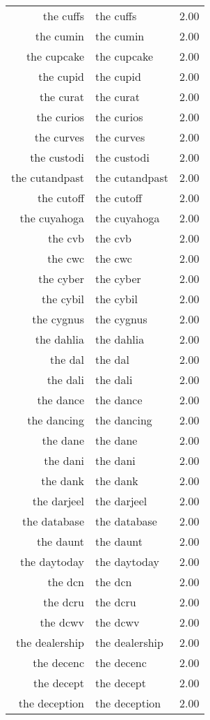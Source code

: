 \begin{table}[ht]
\begin{tabular}{rlr}
  the cuffs & the cuffs & 2.00 \\ 
  the cumin & the cumin & 2.00 \\ 
  the cupcake & the cupcake & 2.00 \\ 
  the cupid & the cupid & 2.00 \\ 
  the curat & the curat & 2.00 \\ 
  the curios & the curios & 2.00 \\ 
  the curves & the curves & 2.00 \\ 
  the custodi & the custodi & 2.00 \\ 
  the cutandpast & the cutandpast & 2.00 \\ 
  the cutoff & the cutoff & 2.00 \\ 
  the cuyahoga & the cuyahoga & 2.00 \\ 
  the cvb & the cvb & 2.00 \\ 
  the cwc & the cwc & 2.00 \\ 
  the cyber & the cyber & 2.00 \\ 
  the cybil & the cybil & 2.00 \\ 
  the cygnus & the cygnus & 2.00 \\ 
  the dahlia & the dahlia & 2.00 \\ 
  the dal & the dal & 2.00 \\ 
  the dali & the dali & 2.00 \\ 
  the dance & the dance & 2.00 \\ 
  the dancing & the dancing & 2.00 \\ 
  the dane & the dane & 2.00 \\ 
  the dani & the dani & 2.00 \\ 
  the dank & the dank & 2.00 \\ 
  the darjeel & the darjeel & 2.00 \\ 
  the database & the database & 2.00 \\ 
  the daunt & the daunt & 2.00 \\ 
  the daytoday & the daytoday & 2.00 \\ 
  the dcn & the dcn & 2.00 \\ 
  the dcru & the dcru & 2.00 \\ 
  the dcwv & the dcwv & 2.00 \\ 
  the dealership & the dealership & 2.00 \\ 
  the decenc & the decenc & 2.00 \\ 
  the decept & the decept & 2.00 \\ 
  the deception & the deception & 2.00 \\ 

\end{tabular}
\end{table}
